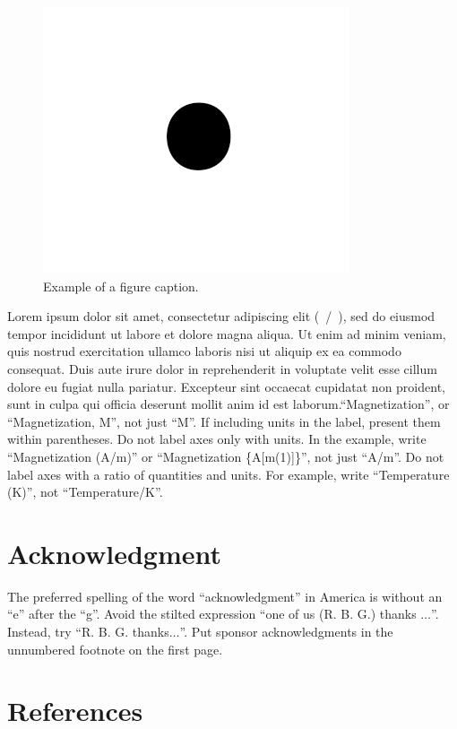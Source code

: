 \documentclass[conference]{IEEEtran}
\begin{document}
\begin{figure}[htbp]
\centerline{\includegraphics{fig1.png}}
\caption{Example of a figure caption.}
\label{fig}
\end{figure}
    Lorem ipsum dolor sit amet, consectetur adipiscing elit (~/~), sed do eiusmod 
    tempor incididunt ut labore et dolore magna aliqua. Ut enim ad minim 
    veniam, quis nostrud exercitation ullamco laboris nisi ut aliquip ex ea 
    commodo consequat. Duis aute irure dolor in reprehenderit in voluptate 
    velit esse cillum dolore eu fugiat nulla pariatur. Excepteur sint occaecat 
    cupidatat non proident, sunt in culpa qui officia deserunt mollit anim id 
    est laborum.``Magnetization'', or ``Magnetization, M'', not just ``M''. 
    If including units in the label, present them within parentheses. Do not 
    label axes only with units. In the example, write ``Magnetization (A/m)'' 
    or ``Magnetization \{A[m(1)]\}'', not just ``A/m''. Do not label axes with 
    a ratio of quantities and units. For example, write ``Temperature (K)'', 
    not ``Temperature/K''.

\section*{Acknowledgment}
    The preferred spelling of the word ``acknowledgment'' in America is without 
    an ``e'' after the ``g''. Avoid the stilted expression ``one of us (R. B. 
    G.) thanks $\ldots$''. Instead, try ``R. B. G. thanks$\ldots$''. Put sponsor 
    acknowledgments in the unnumbered footnote on the first page.

\section*{References}
\end{document}

